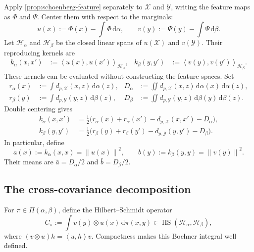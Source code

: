 \documentclass[11pt,a4paper]{article}
\theoremstyle{definition}
\theoremstyle{remark}
\newcommand{\Hcal}{\mathcal H}
\newcommand{\Piopt}{\Pi}
\newcommand{\HS}{\operatorname{HS}}
\newcommand{\dd}{\,\mathrm d}
\newcommand{\norm}[1]{\left\lVert #1\right\rVert}
\newcommand{\ip}[2]{\left\langle #1,#2\right\rangle}
\begin{document}
Apply \cref{prop:schoenberg-feature} separately to \(\mathcal X\) and
\(\mathcal Y\), writing the feature maps as \(\Phi\) and \(\Psi\).  Center
them with respect to the marginals:
\begin{equation}
  u(x):=\Phi(x)-\int\Phi\dd\alpha,
  \qquad
  v(y):=\Psi(y)-\int\Psi\dd\beta.
  \label{eq:centered-features}
\end{equation}
Let \(\Hcal_\alpha\) and \(\Hcal_\beta\) be the closed linear spans of
\(u(\mathcal X)\) and \(v(\mathcal Y)\).  Their reproducing kernels are
\begin{align}
  k_\alpha(x,x')&:=\ip{u(x)}{u(x')}_{\Hcal_\alpha},
  &
  k_\beta(y,y')&:=\ip{v(y)}{v(y')}_{\Hcal_\beta}.
  \label{eq:centered-power-kernels}
\end{align}
These kernels can be evaluated without constructing the feature spaces.  Set
\begin{align}
  r_\alpha(x)&:=\int d_{p,\mathcal X}(x,z)\dd\alpha(z),
  &
  D_\alpha&:=\iint d_{p,\mathcal X}(x,z)\dd\alpha(x)\dd\alpha(z),
  \label{eq:distance-means-alpha}\\
  r_\beta(y)&:=\int d_{p,\mathcal Y}(y,z)\dd\beta(z),
  &
  D_\beta&:=\iint d_{p,\mathcal Y}(y,z)\dd\beta(y)\dd\beta(z).
  \label{eq:distance-means-beta}
\end{align}
Double centering gives
\begin{align}
  k_\alpha(x,x')
  &=\frac12\bigl(r_\alpha(x)+r_\alpha(x')
    -d_{p,\mathcal X}(x,x')-D_\alpha\bigr),
  \label{eq:centered-kernel-alpha-explicit}\\
  k_\beta(y,y')
  &=\frac12\bigl(r_\beta(y)+r_\beta(y')
    -d_{p,\mathcal Y}(y,y')-D_\beta\bigr).
  \label{eq:centered-kernel-beta-explicit}
\end{align}
In particular, define
\begin{equation}
  a(x):=k_\alpha(x,x)=\norm{u(x)}^2,
  \qquad
  b(y):=k_\beta(y,y)=\norm{v(y)}^2.
  \label{eq:feature-radii}
\end{equation}
Their means are \(\bar a=D_\alpha/2\) and \(\bar b=D_\beta/2\).

\subsection{The cross-covariance decomposition}

For \(\pi\in\Piopt(\alpha,\beta)\), define the Hilbert--Schmidt operator
\begin{equation}
  C_\pi
  :=\int v(y)\otimes u(x)\dd\pi(x,y)
  \in\HS(\Hcal_\alpha,\Hcal_\beta),
  \label{eq:hilbert-cross-covariance}
\end{equation}
where \((v\otimes u)h=\ip{u}{h}v\).  Compactness makes this Bochner integral
well defined.
\end{document}
